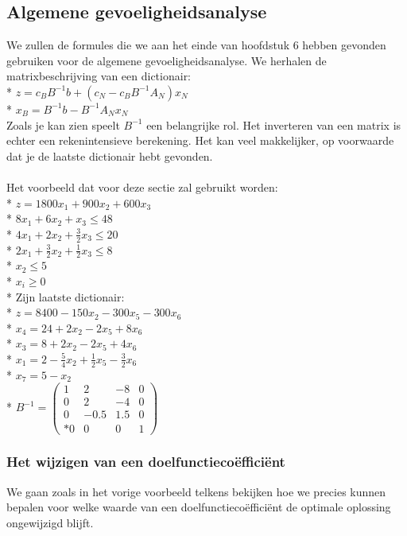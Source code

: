 \documentclass[10pt]{article}
\begin{document}
\subsection{Algemene gevoeligheidsanalyse}
We zullen de formules die we aan het einde van hoofdstuk 6 hebben gevonden gebruiken voor de algemene gevoeligheidsanalyse. We herhalen de matrixbeschrijving van een dictionair:\\*
$z = c_BB^{-1}b + (c_N-c_BB^{-1}A_N)x_N$\\*
$x_B = B^{-1}b - B^{-1}A_Nx_N$\\
Zoals je kan zien speelt $B^{-1}$ een belangrijke rol. Het inverteren van een matrix is echter een rekenintensieve berekening. Het kan veel makkelijker, op voorwaarde dat je de laatste dictionair hebt gevonden.\\\\
Het voorbeeld dat voor deze sectie zal gebruikt worden:\\*
$z = 1800x_1 + 900x_2 + 600x_3$\\*
$8x_1 + 6x_2 + x_3 \le 48$\\*
$4x_1 + 2x_2 + \frac{3}{2}x_3 \le 20$\\*
$2x_1 + \frac{3}{2}x_2 + \frac{1}{2}x_3 \le 8$\\*
$x_2 \le 5$\\*
$x_i \ge 0$\\*
Zijn laatste dictionair:\\*
$z = 8400 - 150x_2 - 300x_5 - 300x_6$\\*
$x_4 = 24 + 2x_2 - 2x_5 + 8x_6$\\*
$x_3 = 8 + 2x_2 - 2x_5 + 4x_6$\\*
$x_1 = 2 - \frac{5}{4}x_2 + \frac{1}{2}x_5 - \frac{3}{2}x_6$\\*
$x_7 = 5 - x_2$\\*
$B^{-1} =
\begin{pmatrix}
1 & 2 & -8 & 0\\
0 & 2 & -4 & 0\\
0 & -0.5 & 1.5 & 0\\*
0 & 0 & 0 & 1
\end{pmatrix}$
\subsubsection{Het wijzigen van een doelfunctieco\"effici\"ent}
We gaan zoals in het vorige voorbeeld telkens bekijken hoe we precies kunnen bepalen voor welke waarde van een doelfunctieco\"effici\"ent de optimale oplossing ongewijzigd blijft.
\end{document}

